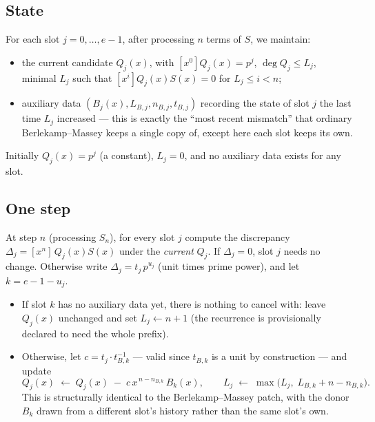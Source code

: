 \documentclass[11pt]{article}
\begin{document}
\subsection{State}
For each slot $j = 0, \ldots, e-1$, after processing $n$ terms of $S$, we
maintain:
\begin{itemize}[leftmargin=1.5em]
  \item the current candidate $Q_j(x)$, with $[x^0]Q_j(x) = p^{j}$,
        $\deg Q_j \le L_j$, minimal $L_j$ such that $[x^i]Q_j(x)S(x) = 0$
        for $L_j \le i < n$;
  \item auxiliary data $(B_j(x), L_{B,j}, n_{B,j}, t_{B,j})$ recording the
        state of slot $j$ the last time $L_j$ increased --- this is exactly
        the ``most recent mismatch'' that ordinary Berlekamp--Massey keeps a
        single copy of, except here each slot keeps its own.
\end{itemize}
Initially $Q_j(x) = p^{j}$ (a constant), $L_j = 0$, and no auxiliary data
exists for any slot.

\subsection{One step}
At step $n$ (processing $S_n$), for every slot $j$ compute the discrepancy
$\Delta_j = [x^n]\,Q_j(x)S(x)$ under the \emph{current} $Q_j$. If
$\Delta_j = 0$, slot $j$ needs no change. Otherwise write
$\Delta_j = t_j\, p^{u_j}$ (unit times prime power), and let
$k = e - 1 - u_j$.

\begin{itemize}[leftmargin=1.5em]
\item If slot $k$ has no auxiliary data yet, there is nothing to cancel
      with: leave $Q_j(x)$ unchanged and set $L_j \leftarrow n+1$ (the
      recurrence is provisionally declared to need the whole prefix).
\item Otherwise, let $c = t_j \cdot t_{B,k}^{-1}$ --- valid since $t_{B,k}$
      is a unit by construction --- and update
      \[
        Q_j(x) \;\leftarrow\; Q_j(x) \;-\; c\, x^{\,n - n_{B,k}}\, B_k(x),
        \qquad
        L_j \;\leftarrow\; \max\bigl(L_j,\; L_{B,k} + n - n_{B,k}\bigr).
      \]
      This is structurally identical to the Berlekamp--Massey patch, with
      the donor $B_k$ drawn from a different slot's history rather than the
      same slot's own.
\end{itemize}
\end{document}
